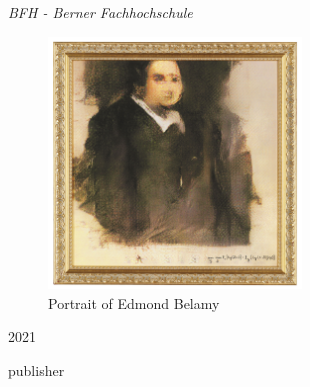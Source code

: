 \begin{titlepage}
	\textit{BFH - Berner Fachhochschule} %

	\vfill %


	\begin{figure}[h!]
		\begin{center}
			\includegraphics[width=0.6\textwidth]{../common/resources/portrait.jpg}
		\end{center}
		\caption{Portrait of Edmond Belamy \cite{Christies:PortraitEdmundBelamy}}
		\label{fig:Portrait of Edmond Belamy}
	\end{figure}

	\vspace{0.3\baselineskip} %

	2021 %

	{\large publisher} %

\end{titlepage}
